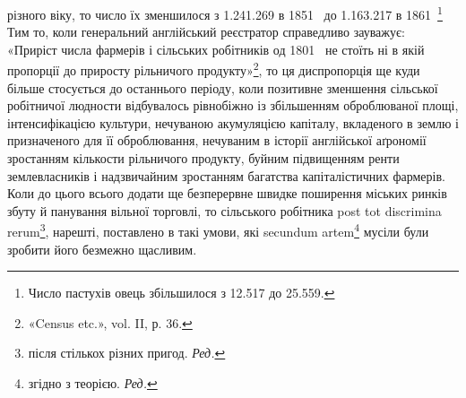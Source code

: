 \parcont{}  %
різного віку, то число їх зменшилося з \num{1.241.269} в 1851~ до
\num{1.163.217} в 1861~\footnote{
Число пастухів овець збільшилося з \num{12.517} до \num{25.559}.
} Тим то, коли генеральний англійський
реєстратор справедливо зауважує: «Приріст числа фармерів і
сільських робітників од 1801~ не стоїть ні в якій пропорції
до приросту рільничого продукту»\footnote{
«Census etc.», vol. II, р. 36.
}, то ця диспропорція ще
куди більше стосується до останнього періоду, коли позитивне
зменшення сільської робітничої людности відбувалось рівнобіжно
із збільшенням оброблюваної площі, інтенсифікацією культури,
нечуваною акумуляцією капіталу, вкладеного в землю і призначеного
для її оброблювання, нечуваним в історії англійської
аґрономії зростанням кількости рільничого продукту, буйним
підвищенням ренти землевласників і надзвичайним зростанням
багатства капіталістичних фармерів. Коли до цього всього додати
ще безперервне швидке поширення міських ринків збуту й
панування вільної торговлі, то сільського робітника post tot
discrimina rerum\footnote*{
після стількох різних пригод. \emph{Ред.}
}, нарешті, поставлено в такі умови, які secundum
artem\footnote*{
згідно з теорією. \emph{Ред.}
} мусіли були зробити його безмежно щасливим.

